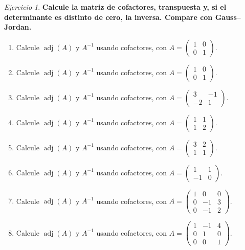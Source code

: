 \documentclass[12pt]{article}
\theoremstyle{remark}
\newtheorem{Ejer}[definicion]{Ejercicio}
\newcommand{\adj}{\operatorname{adj}}
\begin{document}
\begin{Ejer}

\textbf{Calcule la matriz de cofactores, transpuesta y, si el determinante es distinto de cero, la inversa. Compare con Gauss--Jordan.}
\begin{enumerate}[resume=banco]

\item Calcule $\adj(A)$ y $A^{-1}$ usando cofactores, con $A=\begin{pmatrix}1&0\\0&1\end{pmatrix}$.

\item Calcule $\adj(A)$ y $A^{-1}$ usando cofactores, con $A=\begin{pmatrix}1&0\\0&1\end{pmatrix}$.

\item Calcule $\adj(A)$ y $A^{-1}$ usando cofactores, con $A=\begin{pmatrix}3&-1\\-2&1\end{pmatrix}$.

\item Calcule $\adj(A)$ y $A^{-1}$ usando cofactores, con $A=\begin{pmatrix}1&1\\1&2\end{pmatrix}$.

\item Calcule $\adj(A)$ y $A^{-1}$ usando cofactores, con $A=\begin{pmatrix}3&2\\1&1\end{pmatrix}$.

\item Calcule $\adj(A)$ y $A^{-1}$ usando cofactores, con $A=\begin{pmatrix}1&1\\-1&0\end{pmatrix}$.

\item Calcule $\adj(A)$ y $A^{-1}$ usando cofactores, con $A=\begin{pmatrix}1&0&0\\0&-1&3\\0&-1&2\end{pmatrix}$.

\item Calcule $\adj(A)$ y $A^{-1}$ usando cofactores, con $A=\begin{pmatrix}1&-1&4\\0&1&0\\0&0&1\end{pmatrix}$.


\end{enumerate}
\end{Ejer}
\end{document}
